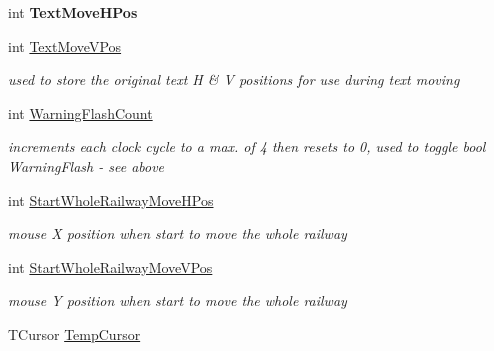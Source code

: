 \begin{DoxyCompactItemize}
\mbox{\label{class_t_interface_a17def25fca48e9790eea56715bd641f4}} 
int {\bfseries Text\+Move\+H\+Pos}
\item 
\mbox{\label{class_t_interface_a31983744b7c13161ed501a3288f8e985}} 
int \mbox{\hyperlink{class_t_interface_a31983744b7c13161ed501a3288f8e985}{Text\+Move\+V\+Pos}}
\begin{DoxyCompactList}\small\item\em used to store the original text \textquotesingle{}H\textquotesingle{} \& \textquotesingle{}V\textquotesingle{} positions for use during text moving \end{DoxyCompactList}\item 
\mbox{\label{class_t_interface_a6bee5767dfc53fea26f3e9abc0cd5d12}} 
int \mbox{\hyperlink{class_t_interface_a6bee5767dfc53fea26f3e9abc0cd5d12}{Warning\+Flash\+Count}}
\begin{DoxyCompactList}\small\item\em increments each clock cycle to a max. of 4 then resets to 0, used to toggle bool Warning\+Flash -\/ see above \end{DoxyCompactList}\item 
\mbox{\label{class_t_interface_a40c0a22cf1ab72cf07aa11befc324923}} 
int \mbox{\hyperlink{class_t_interface_a40c0a22cf1ab72cf07aa11befc324923}{Start\+Whole\+Railway\+Move\+H\+Pos}}
\begin{DoxyCompactList}\small\item\em mouse X position when start to move the whole railway \end{DoxyCompactList}\item 
\mbox{\label{class_t_interface_a2e0518ced8df034a2e11c8caef58bf25}} 
int \mbox{\hyperlink{class_t_interface_a2e0518ced8df034a2e11c8caef58bf25}{Start\+Whole\+Railway\+Move\+V\+Pos}}
\begin{DoxyCompactList}\small\item\em mouse Y position when start to move the whole railway \end{DoxyCompactList}\item 
\mbox{\label{class_t_interface_ab1b67812d2bbd790158bc50e14172b35}} 
T\+Cursor \mbox{\hyperlink{class_t_interface_ab1b67812d2bbd790158bc50e14172b35}{Temp\+Cursor}}

\end{DoxyCompactItemize}

